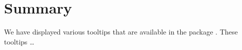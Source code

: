 \hypertarget{summary}{%
\section{Summary}\label{summary}}

We have displayed various tooltips that are available in the package
. These tooltips \ldots{}



\address{%
Quietest Quokka\\
University of Little Mates\\%
Department of Letter Q\\ Somewhere, Australia\\
%
\url{https://www.britannica.com/animal/quokka}\\%
\textit{ORCiD: \href{https://orcid.org/0000-1721-1511-1101}{0000-1721-1511-1101}}\\%
\href{mailto:qquo@ulm.edu}{\nolinkurl{qquo@ulm.edu}}%
}

\address{%
Bounciest Bilby\\
University of Little Mates\\%
Department of Letter B\\ Somewhere, Australia\\
%
\url{https://www.britannica.com/animal/bilby}\\%
\textit{ORCiD: \href{https://orcid.org/0000-0002-0912-0225}{0000-0002-0912-0225}}\\%
\href{mailto:bbil@ulm.edu}{\nolinkurl{bbil@ulm.edu}}%
}
